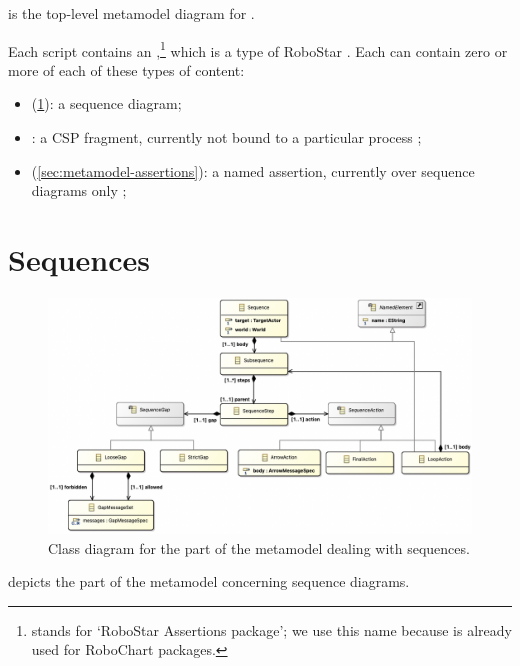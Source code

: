  is the top-level metamodel diagram for \langname.

Each \langname{} script contains an \mrapackage,\footnote{\mrapackage{} stands
for `RoboStar Assertions package'; we use this name because \mrcpackage{} is
already used for RoboChart packages.}
which is a type of RoboStar \mbasicpackage.
Each \mrapackage{} can contain zero or more of each of these types of content:

\begin{itemize}
\item
	\msequence{}
	(\cref{sec:metamodel-sequences}):
	a sequence diagram;
\item
	\mcspfragment:
	a CSP fragment, currently not bound to a particular process
	;
\item
	\mnamedassertion{}
	(\cref{sec:metamodel-assertions}):
	a named assertion, currently over sequence diagrams only
	;
\end{itemize}



\section{Sequences}\label{sec:metamodel-sequences}

\begin{figure}
	\centering
	\includegraphics[width=\textwidth]{diagrams/sequences.png}
	\caption{Class diagram for the part of the \langname{} metamodel dealing with sequences.}
	\label{fig:metamodel-sequences}
\end{figure}

 depicts the part of the metamodel concerning
sequence diagrams.

